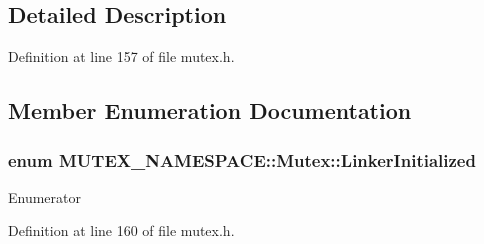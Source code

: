 \subsection{Detailed Description}


Definition at line 157 of file mutex.\+h.



\subsection{Member Enumeration Documentation}
\subsubsection[{\texorpdfstring{Linker\+Initialized}{LinkerInitialized}}]{\setlength{\rightskip}{0pt plus 5cm}enum {\bf M\+U\+T\+E\+X\+\_\+\+N\+A\+M\+E\+S\+P\+A\+C\+E\+::\+Mutex\+::\+Linker\+Initialized}}\hypertarget{classMUTEX__NAMESPACE_1_1Mutex_adc86cefc61118aec82af3bc8bb90e0c0}{}\label{classMUTEX__NAMESPACE_1_1Mutex_adc86cefc61118aec82af3bc8bb90e0c0}
\begin{Desc}
\item[Enumerator]\par
\begin{description}
\item[{\em 
L\+I\+N\+K\+E\+R\+\_\+\+I\+N\+I\+T\+I\+A\+L\+I\+Z\+ED\hypertarget{classMUTEX__NAMESPACE_1_1Mutex_adc86cefc61118aec82af3bc8bb90e0c0a1e3df83eb608cf9744b540a9f395c9ea}{}\label{classMUTEX__NAMESPACE_1_1Mutex_adc86cefc61118aec82af3bc8bb90e0c0a1e3df83eb608cf9744b540a9f395c9ea}
}]\end{description}
\end{Desc}


Definition at line 160 of file mutex.\+h.



